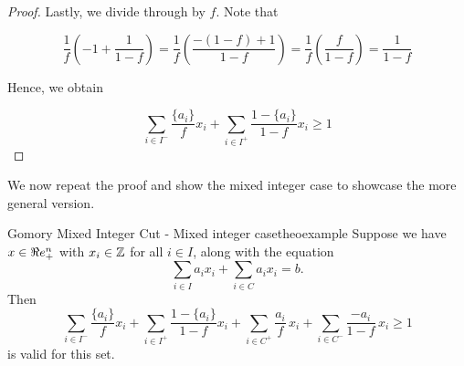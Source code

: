 \begin{proof}
Lastly, we divide through by $f$.  Note that

\begin{equation*}
\frac{1}{f} \left(-1+\frac{1}{1-f}\right) = 
\frac{1}{f} \left(\frac{-(1-f) + 1}{1-f}\right) = 
\frac{1}{f} \left(\frac{f}{1-f}\right) = 
\frac{1}{1-f} 
\end{equation*}

Hence, we obtain

\begin{equation*}
\label{eq:gmic-end}
\sum_{i \in I^{-}} \frac{\{a_i\}}{f} x_i + \sum_{i \in I^+} \frac{1-\{a_i\}}{1-f}x_i  \geq 1
\end{equation*}


\end{proof}

\newpage
We now repeat the proof and show the mixed integer case to showcase the more general version.


\begin{theorem}{Gomory Mixed Integer Cut - Mixed integer case}{theoexample}
Suppose we have $x \in \Re e^n_+$ with $x_i \in {\mathbb{Z}}$ for all $ i \in I$, along with the equation
\begin{equation}
\sum_{i \in I} a_{i}x_{i} + \sum_{i \in C} a_{i}x_{i } = b.
\end{equation}
Then
\begin{equation}
\label{eq:gmic}
\sum_{i \in I^{-}} \frac{\{a_i\}}{f} x_i + \sum_{i \in I^+} \frac{1-\{a_i\}}{1-f}x_i + 
\sum_{i \in C^+} \frac{a_i}{f}\, x_i   + \sum_{i \in C^-}\frac{-a_i}{1-f}\,x_i \geq 1
\end{equation}
is valid for this set.
\end{theorem}


